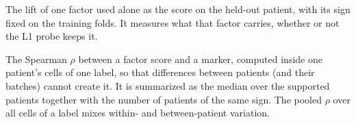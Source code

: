 \begin{description}[leftmargin=0pt,itemsep=3pt,font=\normalfont\bfseries]
\item[Univariate held-out lift.] The lift of one factor used alone as the score on the held-out patient, with its sign fixed on the training folds. It measures what that factor carries, whether or not the L1 probe keeps it.

\item[Within-patient $\rho$.] The Spearman $\rho$ between a factor score and a marker, computed inside one patient's cells of one label, so that differences between patients (and their batches) cannot create it. It is summarized as the median over the supported patients together with the number of patients of the same sign. The pooled $\rho$ over all cells of a label mixes within- and between-patient variation.

\end{description}

